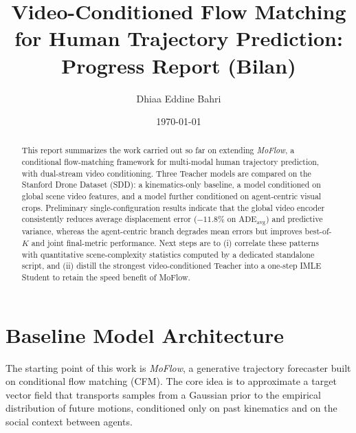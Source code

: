 \documentclass[11pt,a4paper]{article}
\title{Video-Conditioned Flow Matching for Human Trajectory Prediction:\\ Progress Report (Bilan)}
\author{Dhiaa Eddine Bahri}
\date{\today}
\begin{document}
\maketitle

\begin{abstract}
This report summarizes the work carried out so far on extending \emph{MoFlow}, a
conditional flow-matching framework for multi-modal human trajectory prediction,
with dual-stream video conditioning. Three Teacher models are compared on the
Stanford Drone Dataset (SDD): a kinematics-only baseline, a model conditioned on
global scene video features, and a model further conditioned on agent-centric
visual crops. Preliminary single-configuration results indicate that the global
video encoder consistently reduces average displacement error ($-11.8\%$ on
$\mathrm{ADE_{avg}}$) and predictive variance, whereas the agent-centric branch
degrades mean errors but improves best-of-$K$ and joint final-metric performance.
Next steps are to (i) correlate these patterns with quantitative scene-complexity
statistics computed by a dedicated standalone script, and (ii) distill the
strongest video-conditioned Teacher into a one-step IMLE Student to retain the
speed benefit of MoFlow.
\end{abstract}

\section{Baseline Model Architecture}
\label{sec:baseline}

The starting point of this work is \emph{MoFlow}, a generative trajectory forecaster built on conditional flow
matching (CFM). The core idea is to approximate a target vector field that
transports samples from a Gaussian prior to the empirical distribution of future
motions, conditioned only on past kinematics and on the social context between
agents.
\end{document}
